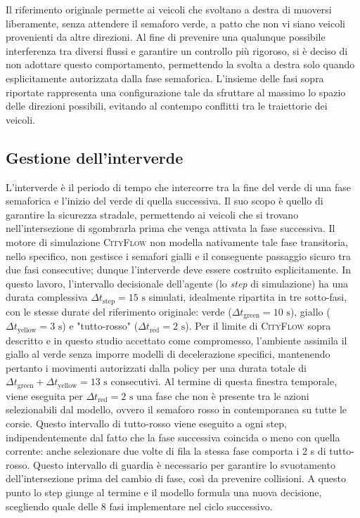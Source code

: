 Il riferimento originale permette ai veicoli che svoltano a destra di muoversi liberamente, senza attendere il semaforo verde, a patto che non vi siano veicoli provenienti da altre direzioni.
Al fine di prevenire una qualunque possibile interferenza tra diversi flussi e garantire un controllo più rigoroso, si è deciso di non adottare questo comportamento, permettendo la svolta a destra solo quando esplicitamente autorizzata dalla fase semaforica.
L'insieme delle fasi sopra riportate rappresenta una configurazione tale da sfruttare al massimo lo spazio delle direzioni possibili,
evitando al contempo conflitti tra le traiettorie dei veicoli.

\subsection{Gestione dell'interverde}
\label{subsec:interverde}

L'interverde è il periodo di tempo che intercorre tra la fine del verde di una fase semaforica
e l'inizio del verde di quella successiva.
Il suo scopo è quello di garantire la sicurezza stradale, permettendo ai veicoli che si trovano nell'intersezione di
sgombrarla prima che venga attivata la fase successiva.
Il motore di simulazione \textsc{CityFlow} non modella nativamente tale fase transitoria, nello specifico, non gestisce i semafori gialli e il conseguente passaggio sicuro tra due fasi consecutive;
dunque l'interverde deve essere costruito esplicitamente.
In questo lavoro, l'intervallo decisionale dell'agente (lo \emph{step} di simulazione) ha una durata complessiva $\Delta t_{\text{step}} = 15 \text{ s}$ simulati,
idealmente ripartita in tre sotto-fasi, con le stesse durate del riferimento originale:
verde ($\Delta t_{\text{green}} = 10 \text{ s}$), giallo ($\Delta t_{\text{yellow}} = 3 \text{ s}$) e "tutto-rosso" ($\Delta t_{\text{red}} = 2 \text{ s}$).
Per il limite di \textsc{CityFlow} sopra descritto e in questo studio accettato come compromesso, l'ambiente assimila il giallo al verde senza imporre modelli di decelerazione specifici,
mantenendo pertanto i movimenti autorizzati dalla policy per una durata totale di  $\Delta t_{\text{green}}+\Delta t_{\text{yellow}} = 13 \text{ s}$ consecutivi.
Al termine di questa finestra temporale, viene eseguita per $\Delta t_{\text{red}} = 2 \text{ s}$ una fase che non è presente tra le azioni selezionabili dal modello,
ovvero il semaforo rosso in contemporanea su tutte le corsie. Questo
intervallo di tutto-rosso viene eseguito a ogni step, indipendentemente
dal fatto che la fase successiva coincida o meno con quella corrente: anche
selezionare due volte di fila la stessa fase comporta i 2 s di
tutto-rosso.
Questo intervallo di guardia è necessario per garantire lo svuotamento dell'intersezione prima del cambio di fase, così da prevenire collisioni.
A questo punto lo step giunge al termine e il modello formula una nuova decisione, scegliendo quale delle 8 fasi implementare nel ciclo successivo.

